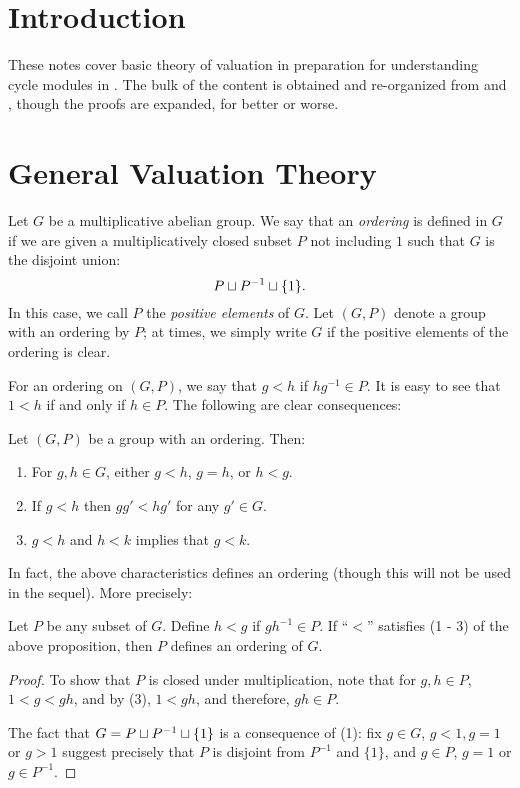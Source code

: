 \section{Introduction}

\noindent These notes cover basic theory of valuation in 
preparation for understanding cycle modules in \cite{Rost96}. The 
bulk of the content is obtained and re-organized from 
\cite{LangAlg} and \cite{MatsCA}, though the proofs are expanded,
for better or worse. 

\section{General Valuation Theory}

\begin{defn}
Let $G$ be a multiplicative abelian group. We say that an 
\emph{ordering} is defined in $G$ if we are given a 
multiplicatively closed subset $P$ not including $1$ such that 
$G$ is the disjoint union:
\[
P \sqcup P^{-1} \sqcup \{1\}.
\]
In this case, we call $P$ the \emph{positive elements} of $G$. Let 
$(G, P)$ denote a group with an ordering by $P$; at times, we 
simply write $G$ if the positive elements of the ordering is 
clear.
\end{defn}

For an ordering on $(G, P)$, we say that $g < h$ if $hg^{-1} \in 
P$. It is easy to see that $1 < h$ if and only if $h \in P$. The
following are clear consequences:

\begin{prop}
Let $(G, P)$ be a group with an ordering. Then:

\begin{enumerate}
\item For $g, h \in G$, either $g < h$, $g = h$, or $h < g$.

\item If $g < h$ then $gg' < hg'$ for any $g' \in G$.

\item $g < h$ and $h < k$ implies that $g < k$.
\end{enumerate}
\end{prop}

In fact, the above characteristics defines an ordering (though 
this will not be used in the sequel). More precisely:

\begin{prop}
Let $P$ be any subset of $G$. Define $h < g$ if $gh^{-1} 
\in P$. If ``$<$'' satisfies (1 - 3) of the above proposition, 
then $P$ defines an ordering of $G$.
\end{prop}
\begin{proof}
To show that $P$ is closed under multiplication, note that for
$g, h \in P$, $1 < g < gh$, and by (3), $1 < gh$, and therefore,
$gh \in P$. 

The fact that $G = P \sqcup P^{-1} \sqcup \{1\}$ is a consequence of
(1): fix $g \in G$, $g < 1, g = 1$ or $g > 1$ suggest precisely
that $P$ is disjoint from $P^{-1}$ and $\{1\}$, and $g \in P$,
$g = 1$ or $g \in P^{-1}$.
\end{proof}

